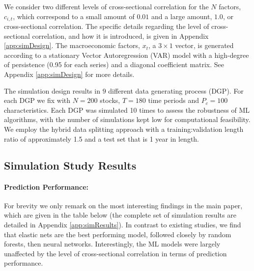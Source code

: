 \documentclass{article}
\begin{document}
We consider two different levels of cross-sectional correlation for the $N$ factors, $c_{i,t}$, which correspond to a small amount of $0.01$ and a large amount, $1.0$, or cross-sectional correlation. The specific details regarding the level of cross-sectional correlation, and how it is introduced, is given in Appendix \ref{app:simDesign}. The macroeconomic factors, $x_t$, a $3 \times 1$ vector, is generated according to a stationary Vector Autoregression (VAR) model with a high-degree of persistence (0.95 for each series) and a diagonal coefficient matrix. See Appendix \ref{app:simDesign} for more details.  

The simulation design results in $9$ different data generating process (DGP). For each DGP we fix with $N = 200$ stocks, $T = 180$ time periods and $P_c = 100$ characteristics. Each DGP was simulated 10 times to assess the robustness of ML algorithms, with the number of simulations kept low for computational feasibility. We employ the hybrid data splitting approach with a training:validation length ratio of approximately 1.5 and a test set that is 1 year in length. 


\subsection{Simulation Study Results}\label{sec:sims} 

\paragraph{Prediction Performance:}
For brevity we only remark on the most interesting findings in the main paper, which are given in the table below (the complete set of simulation results are detailed in Appendix \ref{app:simResults}). In contrast to existing studies, we find that elastic nets are the best performing model, followed closely by random forests, then neural networks. Interestingly, the ML models were largely unaffected by the level of cross-sectional correlation in terms of prediction performance.
\end{document}
